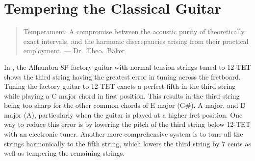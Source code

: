 %
%
%

 \section{Tempering the Classical Guitar\label{app:temp}}

 \begin{quote}
 Temperament: A compromise between the acoustic purity of theoretically exact intervals, and the harmonic discrepancies arising from their practical employment. --- Dr.\ Theo.\ Baker~\cite{ref:baker1895dmt}
 \end{quote}

In , the Alhambra 8P factory guitar with normal tension strings tuned to 12-TET shows the third string having the greatest error in tuning across the fretboard. Tuning the factory guitar to 12-TET exacts a perfect-fifth in the third string while playing a C major chord in first position. This results in the third string being too sharp for the other common chords of E major (G\#), A major, and D major (A), particularly when the guitar is played at a higher fret position. One way to reduce this error is by lowering the pitch of the third string below 12-TET with an electronic tuner. Another more comprehensive system is to tune all the strings harmonically to the fifth string, which lowers the third string by 7 cents as well as tempering the remaining strings.

